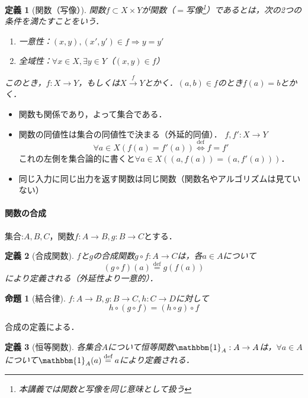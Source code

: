 \documentclass[dvipdfmx,a4j,10pt]{jsarticle}
\makeatletter
\theoremstyle{mystyle1}
\theoremstyle{mystyle2}
\newtheorem{dfn*}{定義}
\newtheorem{prop*}{命題}
\theoremstyle{mystyle3}
\renewenvironment{proof}[1][\proofname]{\par
  \pushQED{\qed}%
  \normalfont
  \topsep6\p@\@plus6\p@ \trivlist
  \item[\hskip\labelsep{\bfseries\sffamily #1}]\ignorespaces
}{%
  \popQED\endtrivlist\@endpefalse
}
\renewcommand\proofname{証明}
\newcommand{\defLeftrightarrow}{\overset{\text{def}}{\iff}}
\newcommand*{\defeq}{\stackrel{\text{def}}{=}}
\makeatother
\begin{document}
\begin{dfn*}[関数（写像）]
    関数$f\subset X\times Y$が関数（$=$写像\footnote{本講義では関数と写像を同じ意味として扱う}）であるとは，次の2つの条件を満たすことをいう．
    \begin{enumerate}
        \item 一意性：$(x,y),(x',y')\in f\Rightarrow y=y'$
        \item 全域性：$\forall x\in X,\exists y \in Y$（$(x,y)\in f$）
    \end{enumerate}
    このとき，$f:X\to Y$，もしくは$X\xrightarrow{f} Y$とかく．$(a,b)\in f$のとき$f(a)=b$とかく．
\end{dfn*}

\begin{itemize}
    \item 関数も関係であり，よって集合である．
    \item 関数の同値性は集合の同値性で決まる（外延的同値）．
          $f,f':X\to Y$
          \[
              \forall a\in X(f(a)=f'(a))\defLeftrightarrow f=f'
          \]
          これの左側を集合論的に書くと$\forall a\in X ((a,f(a))=(a,f'(a)))$．
    \item 同じ入力に同じ出力を返す関数は同じ関数（関数名やアルゴリズムは見ていない）
\end{itemize}

\paragraph{関数の合成}

集合:$A,B,C$，関数$f:A\to B,g:B\to C$とする．

\begin{dfn*}[合成関数]
    $f$と$g$の合成関数$g\circ f:A\to C$は，各$a\in A$について
    \[
        (g\circ f)(a)\defeq g(f(a))
    \]
    により定義される（外延性より一意的）．
\end{dfn*}

\begin{prop*}[結合律]
    $f:A\to B, g:B\to C, h:C\to D$に対して
    \[
        h\circ (g\circ f)=(h\circ g)\circ f
    \]
\end{prop*}
\begin{proof}
    合成の定義による．
\end{proof}

\begin{dfn*}[恒等関数]
    各集合$A$について恒等関数$\mathbbm{1}_A:A\to A$は，$\forall a\in A$について$\mathbbm{1}_A(a)\defeq a$により定義される．
\end{dfn*}
\end{document}
